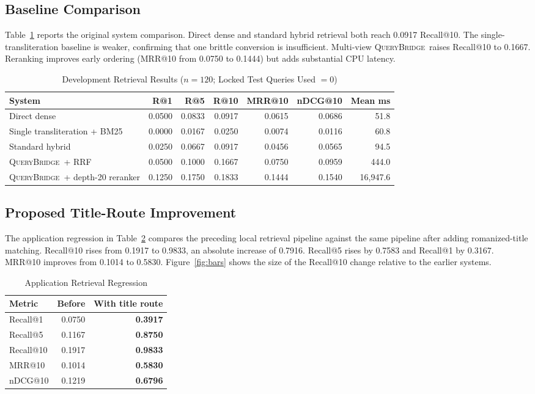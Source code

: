 \documentclass[conference]{IEEEtran}
\newcommand{\querybridge}{\textsc{QueryBridge}}
\begin{document}
\subsection{Baseline Comparison}
Table~\ref{tab:systems} reports the original system comparison. Direct dense and standard hybrid retrieval both reach 0.0917 Recall@10. The single-transliteration baseline is weaker, confirming that one brittle conversion is insufficient. Multi-view \querybridge\ raises Recall@10 to 0.1667. Reranking improves early ordering (MRR@10 from 0.0750 to 0.1444) but adds substantial CPU latency.

\begin{table}[t]
\caption{Development Retrieval Results ($n=120$; Locked Test Queries Used $=0$)}
\label{tab:systems}
\centering
\small
\begin{tabular}{@{}lrrrrrr@{}}
\toprule
System & R@1 & R@5 & R@10 & MRR@10 & nDCG@10 & Mean ms \\
\midrule
Direct dense & 0.0500 & 0.0833 & 0.0917 & 0.0615 & 0.0686 & 51.8 \\
Single transliteration + BM25 & 0.0000 & 0.0167 & 0.0250 & 0.0074 & 0.0116 & 60.8 \\
Standard hybrid & 0.0250 & 0.0667 & 0.0917 & 0.0456 & 0.0565 & 94.5 \\
\querybridge\ + RRF & 0.0500 & 0.1000 & 0.1667 & 0.0750 & 0.0959 & 444.0 \\
\querybridge\ + depth-20 reranker & 0.1250 & 0.1750 & 0.1833 & 0.1444 & 0.1540 & 16,947.6 \\
\bottomrule
\end{tabular}
\end{table}

\subsection{Proposed Title-Route Improvement}
The application regression in Table~\ref{tab:title} compares the preceding local retrieval pipeline against the same pipeline after adding romanized-title matching. Recall@10 rises from 0.1917 to 0.9833, an absolute increase of 0.7916. Recall@5 rises by 0.7583 and Recall@1 by 0.3167. MRR@10 improves from 0.1014 to 0.5830. Figure~\ref{fig:bars} shows the size of the Recall@10 change relative to the earlier systems.

\begin{table}[t]
\caption{Application Retrieval Regression}
\label{tab:title}
\centering
\small
\begin{tabular}{@{}lrr@{}}
\toprule
Metric & Before & With title route \\
\midrule
Recall@1 & 0.0750 & \textbf{0.3917} \\
Recall@5 & 0.1167 & \textbf{0.8750} \\
Recall@10 & 0.1917 & \textbf{0.9833} \\
MRR@10 & 0.1014 & \textbf{0.5830} \\
nDCG@10 & 0.1219 & \textbf{0.6796} \\
\bottomrule
\end{tabular}
\end{table}
\end{document}
